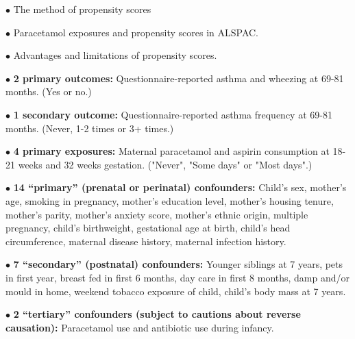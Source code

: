 \item{$\bullet$} The method of propensity scores

\item{$\bullet$} Paracetamol exposures and propensity scores in ALSPAC.

\item{$\bullet$} Advantages and limitations of propensity scores.

\enditems

\vfill\eject


\beginitems

\item{$\bullet$} {\bf 2 primary outcomes:} Questionnaire-reported asthma and wheezing at 69-81 months. (Yes or no.)

\item{$\bullet$} {\bf 1 secondary outcome:} Questionnaire-reported asthma frequency at 69-81 months. (Never, 1-2 times or 3+ times.)

\item{$\bullet$} {\bf 4 primary exposures:} Maternal paracetamol and aspirin consumption at 18-21 weeks and 32 weeks gestation.
("Never", "Some days" or "Most days".)

\item{$\bullet$} {\bf 14 ``primary'' (prenatal or perinatal) confounders:} Child's sex, mother's age, smoking in pregnancy, mother's education level,
mother's housing tenure, mother's parity, mother's anxiety score, mother's ethnic origin, multiple pregnancy,
child's birthweight, gestational age at birth, child's head circumference, maternal disease history, maternal infection history.

\item{$\bullet$} {\bf 7 ``secondary'' (postnatal) confounders:} Younger siblings at 7 years, pets in first year, breast fed in first 6 months, day care in first 8 months,
damp and/or mould in home, weekend tobacco exposure of child, child's body mass at 7 years.

\item{$\bullet$} {\bf 2 ``tertiary'' confounders (subject to cautions about reverse causation):} Paracetamol use and antibiotic use during infancy.

\enditems

\vfill\eject
\line{}\vfill


